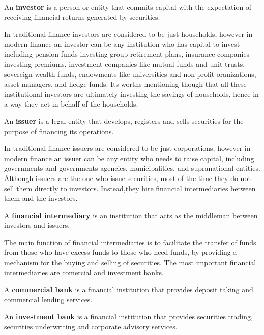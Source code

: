 \bd[Investor]
An \textbf{investor} is a person or entity that commits capital with the expectation of receiving financial returns
generated by securities.
\ed

In traditional finance investors are considered to be just households, however in modern finance an investor can be any
institution who has capital to invest including pension funds investing group retirement plans, insurance companies
investing premiums, investment companies like mutual funds and unit trusts, sovereign wealth funds, endowments like
universities and non-profit oranizations, asset managers, and hedge funds. Its worths mentioning though that all these
institutional investors are ultimately investing the savings of households, hence in a way they act in behalf of the
households.

\bd[Issuer]
An \textbf{issuer} is a legal entity that develops, registers and sells securities for the purpose of financing its
operations.
\ed

In traditional finance issuers are considered to be just corporations, however in modern finance an issuer can be any
entity who needs to raise capital, including governments and governments agencies, municipalities, and supranational
entities. \v

Although issuers are the one who issue securities, most of the time they do not sell them directly to investors.
Instead,they hire financial intermediaries between them and the investors.

A \textbf{financial intermediary} is an institution that acts as the middleman between investors and issuers.
\ed

The main function of financial intermediaries is to facilitate the transfer of funds from those who have excess funds
to those who need funds, by providing a mechanism for the buying and selling of securities. The most important
financial intermediaries are comercial and investment banks.


A \textbf{commercial bank} is a financial institution that provides deposit taking and commercial lending services.
\ed


An \textbf{investment bank} is a financial institution that provides securities trading, securities underwriting and
corporate advisory services.
\ed


